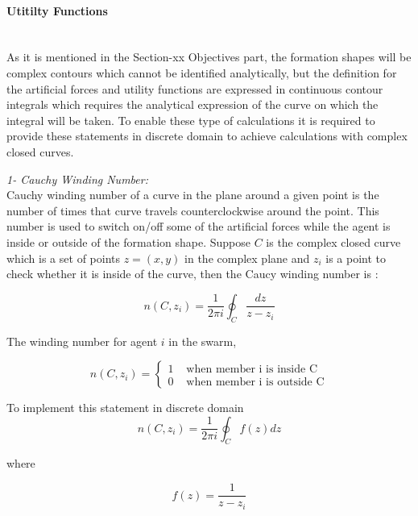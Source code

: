 \paragraph{Utitilty Functions}\hspace{0pt} \\
As it is mentioned in the Section-xx Objectives part, the formation shapes will be complex contours which cannot be identified analytically, but the definition for the artificial forces and utility functions are expressed in continuous contour integrals which requires the analytical expression of the curve on which the integral will be taken. To enable these type of calculations it is required to provide these statements in discrete domain to achieve calculations with complex closed curves. \\ \newline

\textit{ 		1- Cauchy Winding Number:} \\ 
Cauchy winding number of a curve in the plane around a given point is the number of times that curve travels counterclockwise around the point. This number is used to switch on/off some of the artificial forces while the agent is inside or outside of the formation shape. Suppose $C$ is the complex closed curve which is a set of points $z=(x,y)$ in the complex plane  and $z_i$ is a point to check whether it is inside of the curve, then the Caucy winding number is :
					
\begin{equation}
 n(C,z_i) = \frac{1}{2\pi i}\oint_C \frac{dz}{z-z_i}
\end{equation}
		
The winding number for agent $i$ in the swarm,

\begin{equation}
n(C,z_i) = \left\{ \begin{array}{rl}
1 &\mbox{ when member i is inside C} \\
0 &\mbox{ when member i is outside C}
\end{array} \right.
\end{equation}

To implement this statement in discrete domain 
\begin{equation}
n(C,z_i) = \frac{1}{2\pi i} \oint_C f(z)dz
\end{equation}

where 

\begin{equation}
f(z) = \frac{1}{z-z_i}
\end{equation}
		
